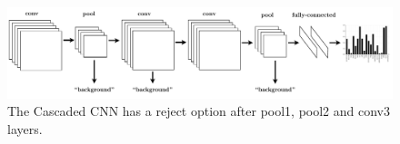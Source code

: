 \begin{figure}[h!]
\begin{center}
\includegraphics[width=0.98\columnwidth]{../ccnn/figures/ccnn.pdf}
\caption{
The Cascaded CNN has a reject option after pool1, pool2 and conv3 layers.
}\label{fig:ccnn}
\end{center}
\end{figure}
